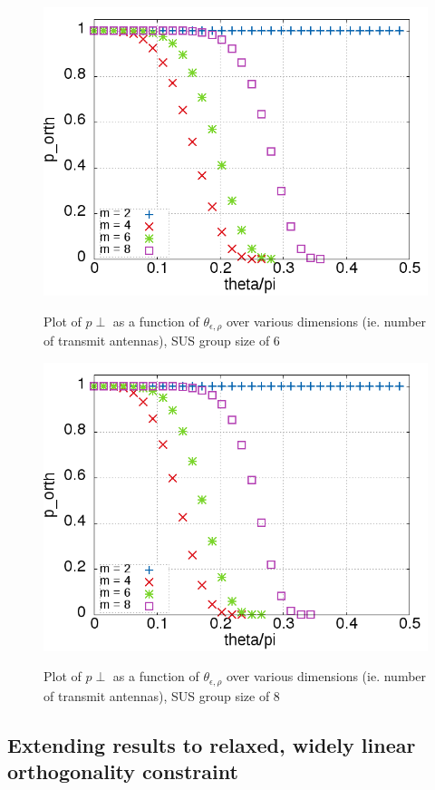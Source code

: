 \begin{figure}
    \includegraphics[width=12cm]{figs/p_orth_gs_6.png}\\
    \caption{Plot of $p{\perp}$ as a function of $\theta_{\epsilon,\rho}$ over various dimensions (ie. number of transmit antennas), SUS group size of 6}
    \label{fig:p_orth_gs_6}
\end{figure}

\begin{figure}
    \includegraphics[width=12cm]{figs/p_orth_gs_8.png}\\
    \caption{Plot of $p{\perp}$ as a function of $\theta_{\epsilon,\rho}$ over various dimensions (ie. number of transmit antennas), SUS group size of 8}
    \label{fig:p_orth_gs_8}
\end{figure}

\newpage
\subsection{Extending results to relaxed, widely linear orthogonality constraint}

